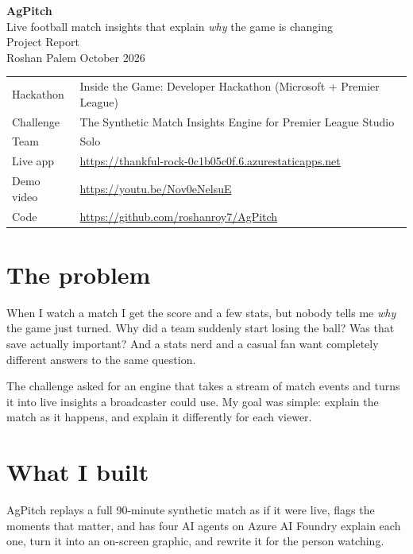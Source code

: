 \documentclass[11pt,a4paper]{article}
\begin{document}
\begin{center}
  {\LARGE\bfseries AgPitch}\\[4pt]
  {\large Live football match insights that explain \emph{why} the game is changing}\\[10pt]
  Project Report\\[2pt]
  Roshan Palem \quad\textperiodcentered\quad October 2026
\end{center}

\vspace{4pt}
\begin{tabularx}{\textwidth}{@{}lX@{}}
\toprule
Hackathon  & Inside the Game: Developer Hackathon (Microsoft + Premier League) \\
Challenge  & The Synthetic Match Insights Engine for Premier League Studio \\
Team       & Solo \\
Live app   & \url{https://thankful-rock-0c1b05c0f.6.azurestaticapps.net} \\
Demo video & \url{https://youtu.be/Nov0eNelsuE} \\
Code       & \url{https://github.com/roshanroy7/AgPitch} \\
\bottomrule
\end{tabularx}

\section{The problem}

When I watch a match I get the score and a few stats, but nobody tells me \emph{why} the game just turned. Why did a team suddenly start losing the ball? Was that save actually important? And a stats nerd and a casual fan want completely different answers to the same question.

The challenge asked for an engine that takes a stream of match events and turns it into live insights a broadcaster could use. My goal was simple: explain the match as it happens, and explain it differently for each viewer.

\section{What I built}

AgPitch replays a full 90-minute synthetic match as if it were live, flags the moments that matter, and has four AI agents on Azure AI Foundry explain each one, turn it into an on-screen graphic, and rewrite it for the person watching.
\end{document}
